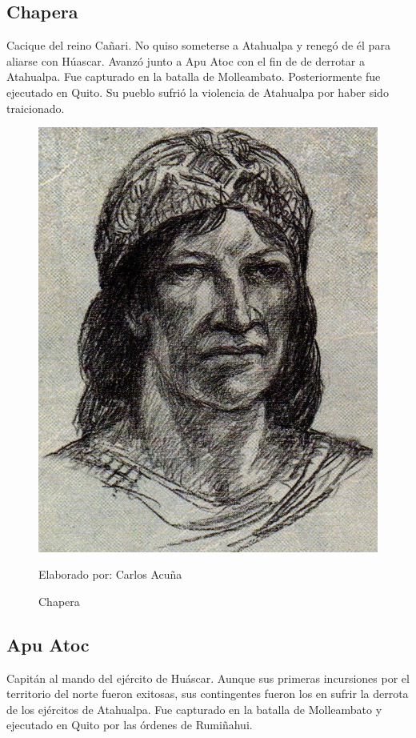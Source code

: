\documentclass[a4paper, openright, 12pt]{report}
\begin{document}
\clearpage
\subsection*{Chapera}
\justify
Cacique del reino Cañari. No quiso someterse a Atahualpa y renegó de él para aliarse con Húascar. Avanzó junto a Apu Atoc con el fin de de derrotar a Atahualpa. Fue capturado en la batalla de Molleambato. Posteriormente fue ejecutado en Quito. Su pueblo sufrió la violencia de Atahualpa por haber sido traicionado. \cite{2010batallas}

\begin{figure}[h]
\captionsetup{justification=centering,margin=2cm}
\includegraphics[scale=0.8]{h7}
\centering
\caption{Chapera}
Elaborado por: Carlos Acuña
\label{fig:h7}
\end{figure}

\subsection*{Apu Atoc}
\justify
Capitán al mando del ejército de Huáscar. Aunque sus primeras incursiones por el territorio del norte fueron exitosas, sus contingentes fueron los en sufrir la derrota de los ejércitos de Atahualpa. Fue capturado en la batalla de Molleambato y ejecutado en Quito por las órdenes de Rumiñahui. \cite{2010batallas}
\end{document}
